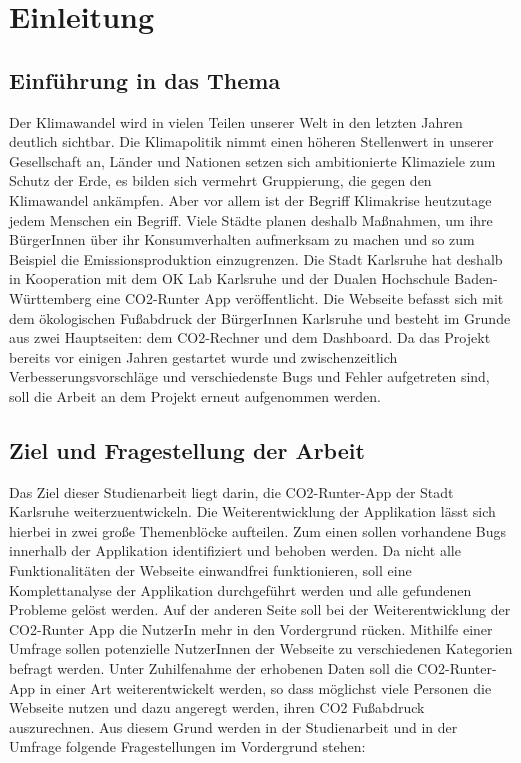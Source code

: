 
\chapter{Einleitung}
\label{chapter:1}

\section{Einführung in das Thema}

Der Klimawandel wird in vielen Teilen unserer Welt in den letzten Jahren deutlich sichtbar.
Die Klimapolitik nimmt einen höheren Stellenwert in unserer Gesellschaft an, Länder und Nationen setzen sich ambitionierte Klimaziele zum Schutz der Erde, es bilden sich vermehrt Gruppierung, die gegen den Klimawandel ankämpfen. Aber vor allem ist der Begriff Klimakrise heutzutage jedem Menschen ein Begriff. Viele Städte planen deshalb Maßnahmen, um ihre BürgerInnen über ihr Konsumverhalten aufmerksam zu machen und so zum Beispiel die Emissionsproduktion einzugrenzen.  Die Stadt Karlsruhe hat deshalb in Kooperation mit dem OK Lab Karlsruhe und der Dualen Hochschule Baden-Württemberg eine CO2-Runter App veröffentlicht. Die Webseite befasst sich mit dem ökologischen Fußabdruck der BürgerInnen Karlsruhe und besteht im Grunde aus zwei Hauptseiten: dem CO2-Rechner und dem Dashboard. Da das Projekt bereits vor einigen Jahren gestartet wurde und zwischenzeitlich Verbesserungsvorschläge und verschiedenste Bugs und Fehler aufgetreten sind, soll die Arbeit an dem Projekt erneut aufgenommen werden.

\section{Ziel und Fragestellung der Arbeit}

Das Ziel dieser Studienarbeit liegt darin, die CO2-Runter-App der Stadt Karlsruhe weiterzuentwickeln. Die Weiterentwicklung der Applikation lässt sich hierbei in zwei große Themenblöcke aufteilen. Zum einen sollen vorhandene Bugs innerhalb der Applikation identifiziert und behoben werden. Da nicht alle Funktionalitäten der Webseite einwandfrei funktionieren, soll eine Komplettanalyse der Applikation durchgeführt werden und alle gefundenen Probleme gelöst werden. Auf der anderen Seite soll bei der Weiterentwicklung der CO2-Runter App die NutzerIn mehr in den Vordergrund rücken. Mithilfe einer Umfrage sollen potenzielle NutzerInnen der Webseite zu verschiedenen Kategorien befragt werden. Unter Zuhilfenahme der erhobenen Daten soll die CO2-Runter-App in einer Art weiterentwickelt werden, so dass möglichst viele Personen die Webseite nutzen und dazu angeregt werden, ihren CO2 Fußabdruck auszurechnen. Aus diesem Grund werden in der Studienarbeit und in der Umfrage folgende Fragestellungen im Vordergrund stehen:

